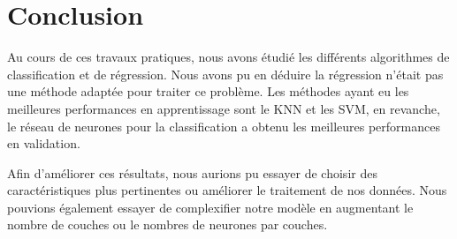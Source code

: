 \chapter{Conclusion}

Au cours de ces travaux pratiques, nous avons étudié les différents algorithmes de classification et de régression. Nous avons pu
en déduire la régression n'était pas une méthode adaptée pour traiter ce problème. Les méthodes ayant eu les meilleures performances
en apprentissage sont le KNN et les SVM, en revanche, le réseau de neurones pour la classification a obtenu les meilleures performances
en validation.

Afin d'améliorer ces résultats, nous aurions pu essayer de choisir des caractéristiques plus pertinentes ou améliorer le traitement de nos données.
Nous pouvions également essayer de complexifier notre modèle en augmentant le nombre de couches ou le nombres de neurones par couches.
